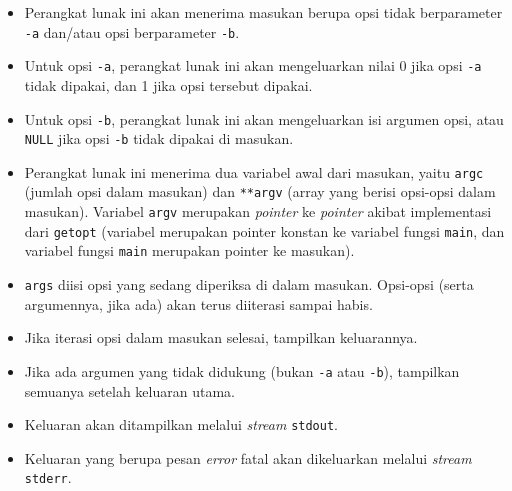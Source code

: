 \begin{itemize}
	\item Perangkat lunak ini akan menerima masukan berupa opsi tidak berparameter \verb|-a| dan/atau opsi berparameter \verb|-b|.
	\item Untuk opsi \verb|-a|, perangkat lunak ini akan mengeluarkan nilai 0 jika opsi \verb|-a| tidak dipakai, dan 1 jika opsi tersebut dipakai.
	\item Untuk opsi \verb|-b|, perangkat lunak ini akan mengeluarkan isi argumen opsi, atau \verb|NULL| jika opsi \verb|-b| tidak dipakai di masukan.
	\item Perangkat lunak ini menerima dua variabel awal dari masukan, yaitu \verb|argc| (jumlah opsi dalam masukan) dan \verb|**argv| (array yang berisi opsi-opsi dalam masukan). Variabel \verb|argv| merupakan \textit{pointer} ke \textit{pointer} akibat implementasi dari \verb|getopt| (variabel merupakan pointer konstan ke variabel fungsi \verb|main|, dan variabel fungsi \verb|main| merupakan pointer ke masukan).
	\item \verb|args| diisi opsi yang sedang diperiksa di dalam masukan. Opsi-opsi (serta argumennya, jika ada) akan terus diiterasi sampai habis.
	\item Jika iterasi opsi dalam masukan selesai, tampilkan keluarannya.
	\item Jika ada argumen yang tidak didukung (bukan \verb|-a| atau \verb|-b|), tampilkan semuanya setelah keluaran utama.
	\item Keluaran akan ditampilkan melalui \textit{stream} \verb|stdout|.
	\item Keluaran yang berupa pesan \textit{error} fatal akan dikeluarkan melalui \textit{stream} \verb|stderr|.
\end{itemize}

